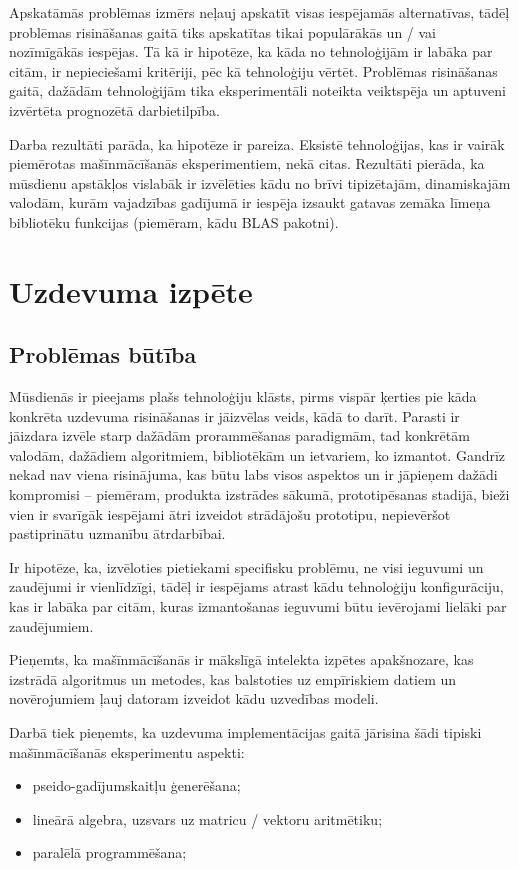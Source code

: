 \documentclass{ludis}
\begin{document}
Apskatāmās problēmas izmērs neļauj apskatīt visas iespējamās alternatīvas, tādēļ problēmas risināšanas gaitā tiks apskatītas tikai populārākās un / vai nozīmīgākās iespējas. Tā kā ir hipotēze, ka kāda no tehnoloģijām ir labāka par citām, ir nepieciešami kritēriji, pēc kā tehnoloģiju vērtēt. Problēmas risināšanas gaitā, dažādām tehnoloģijām tika eksperimentāli noteikta veiktspēja un aptuveni izvērtēta prognozētā darbietilpība.

Darba rezultāti parāda, ka hipotēze ir pareiza. Eksistē tehnoloģijas, kas ir vairāk piemērotas mašīnmācīšanās eksperimentiem, nekā citas. Rezultāti pierāda, ka mūsdienu apstākļos vislabāk ir izvēlēties kādu no brīvi tipizētajām, dinamiskajām valodām, kurām vajadzības gadījumā ir iespēja izsaukt gatavas zemāka līmeņa bibliotēku funkcijas (piemēram, kādu BLAS pakotni).

\chapter{Uzdevuma izpēte}
\section{Problēmas būtība}
Mūsdienās ir pieejams plašs tehnoloģiju klāsts, pirms vispār ķerties pie kāda konkrēta uzdevuma risināšanas ir jāizvēlas veids, kādā to darīt. Parasti ir jāizdara izvēle starp dažādām prorammēšanas paradigmām, tad konkrētām valodām, dažādiem algoritmiem, bibliotēkām un ietvariem, ko izmantot. Gandrīz nekad nav viena risinājuma, kas būtu labs visos aspektos un ir jāpieņem dažādi kompromisi -- piemēram, produkta izstrādes sākumā, prototipēsanas stadijā, bieži vien ir svarīgāk iespējami ātri izveidot strādājošu prototipu, nepievēršot pastiprinātu uzmanību ātrdarbībai.

Ir hipotēze, ka, izvēloties pietiekami specifisku problēmu, ne visi ieguvumi un zaudējumi ir vienlīdzīgi, tādēļ ir iespējams atrast kādu tehnoloģiju konfigurāciju, kas ir labāka par citām, kuras izmantošanas ieguvumi būtu ievērojami lielāki par zaudējumiem.

Pieņemts, ka mašīnmācīšanās ir mākslīgā intelekta izpētes apakšnozare, kas izstrādā algoritmus un metodes, kas balstoties uz empīriskiem datiem un novērojumiem ļauj datoram izveidot kādu uzvedības modeli.

Darbā tiek pieņemts, ka uzdevuma implementācijas gaitā jārisina šādi tipiski mašīnmācīšanās eksperimentu aspekti:
\begin{itemize}
\item pseido-gadījumskaitļu ģenerēšana;
\item lineārā algebra, uzsvars uz matricu / vektoru aritmētiku;
\item paralēlā programmēšana;
\end{itemize}
\end{document}
